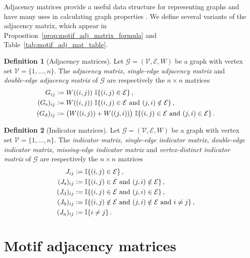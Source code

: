 \documentclass[12pt]{ociamthesis}
\theoremstyle{plain}
\theoremstyle{definition}
\newtheorem{definition}{Definition}[chapter]
\theoremstyle{remark}
\newcommand\bb[1]{\mathbb{#1}}
\newcommand\ca[1]{\mathcal{#1}}
\begin{document}
Adjacency matrices provide a useful data structure for representing graphs and
have many uses in calculating graph properties \cite{bapat2010graphs}.  We
define several variants of the adjacency matrix, which appear in
Proposition~\ref{prop:motif_adj_matrix_formula} and
Table~\ref{tab:motif_adj_mat_table}.

\begin{definition}[Adjacency matrices]
Let $\ca{G} = (\ca{V,E},W)$ be a graph with vertex set $\ca{V} = \{1, \ldots,
n \}$. The \emph{adjacency matrix, single-edge adjacency matrix} and
\emph{double-edge adjacency matrix} of $\ca{G}$ are respectively the $n
\times n$ matrices
\begin{align*}
G_{i j} &\vcentcolon= W((i,j)) \ \bb{I} \{ (i,j) \in \ca{E} \}\,, \\
(G_\mathrm{s})_{i j} &\vcentcolon= W((i,j)) \ \bb{I} \{ (i,j) \in \ca{E}
\textrm{ and } (j,i) \notin \ca{E} \}\,, \\
(G_\mathrm{d})_{i j} &\vcentcolon= \big( W((i,j)) + W((j,i)) \big) \ \bb{I}
\{ (i,j) \in \ca{E} \textrm{ and } (j,i) \in \ca{E} \}\,.
\end{align*}
\end{definition}

\begin{definition}[Indicator matrices]
Let $\ca{G} = (\ca{V,E},W)$ be a graph with vertex set $\ca{V} = \{1, \ldots,
n \}$. The \emph{indicator matrix, single-edge indicator matrix, double-edge
indicator matrix, missing-edge indicator matrix} and \emph{vertex-distinct
indicator matrix} of $\ca{G}$ are respectively the $n \times n$ matrices
\begin{align*}
J_{i j} &\vcentcolon= \bb{I} \{ (i,j) \in \ca{E} \}\,, \\
(J_\mathrm{s})_{i j} &\vcentcolon= \bb{I} \{ (i,j) \in \ca{E} \textrm{ and }
(j,i) \notin \ca{E} \}\,, \\
(J_\mathrm{d})_{i j} &\vcentcolon= \bb{I} \{ (i,j) \in \ca{E} \textrm{ and }
(j,i) \in \ca{E} \}\,, \\
(J_0)_{i j} &\vcentcolon= \bb{I} \{ (i,j) \notin \ca{E} \textrm{ and } (j,i)
\notin \ca{E} \textrm{ and } i \neq j \}\,, \\
(J_\mathrm{n})_{i j} &\vcentcolon= \bb{I} \{ i \neq j \}\,.
\end{align*}
\end{definition}

\section{Motif adjacency matrices} \label{sec:graphs_motif_adj_matrices}
\end{document}
